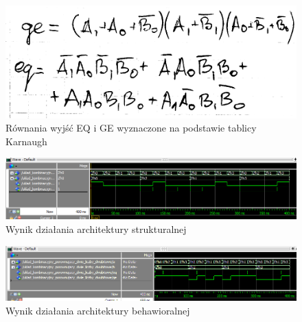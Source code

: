 \documentclass[13pt, a4paper, twoside]{mwart}
\begin{document}
\begin{figure}[h]
	\centering
	\includegraphics[width=0.4\linewidth]{geeq.png}
	\caption{Równania wyjść EQ i GE wyznaczone na podstawie tablicy Karnaugh}
\end{figure}



\clearpage


\begin{figure}[h]
	\centering
	\includegraphics[width=\linewidth]{compare_structural.png}
  \caption{Wynik działania architektury strukturalnej}
\end{figure}

\begin{figure}[h]
	\centering
	\includegraphics[width=\linewidth]{compare_behavioral.png}
  \caption{Wynik działania architektury behawioralnej}
\end{figure}

\end{document}
